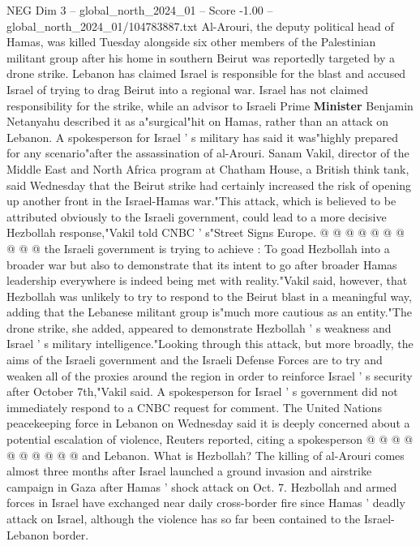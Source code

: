 \begin{textsample}{NEG Dim 3 – global\_north\_2024\_01 – Score -1.00 – global\_north\_2024\_01/104783887.txt}  \label{ex:f3_neg_219}
Al-Arouri, the deputy political head of Hamas, was killed Tuesday alongside six other members of the Palestinian militant group after his home in southern Beirut was reportedly targeted by a drone strike.
Lebanon has claimed Israel is responsible for the blast and accused Israel of trying to drag Beirut into a regional war.
Israel has not claimed responsibility for the strike, while an advisor to Israeli Prime \textbf{Minister} Benjamin Netanyahu described it as a"surgical"hit on Hamas, rather than an attack on Lebanon.
A spokesperson for Israel ' s military has said it was"highly prepared for any scenario"after the assassination of al-Arouri.
Sanam Vakil, director of the Middle East and North Africa program at Chatham House, a British think tank, said Wednesday that the Beirut strike had certainly increased the risk of opening up another front in the Israel-Hamas war."This attack, which is believed to be attributed obviously to the Israeli government, could lead to a more decisive Hezbollah response,"Vakil told CNBC ' s"Street Signs Europe. @ @ @ @ @ @ @ @ @ @ the Israeli government is trying to achieve : To goad Hezbollah into a broader war but also to demonstrate that its intent to go after broader Hamas leadership everywhere is indeed being met with reality."Vakil said, however, that Hezbollah was unlikely to try to respond to the Beirut blast in a meaningful way, adding that the Lebanese militant group is"much more cautious as an entity."The drone strike, she added, appeared to demonstrate Hezbollah ' s weakness and Israel ' s military intelligence."Looking through this attack, but more broadly, the aims of the Israeli government and the Israeli Defense Forces are to try and weaken all of the proxies around the region in order to reinforce Israel ' s security after October 7th,"Vakil said.
A spokesperson for Israel ' s government did not immediately respond to a CNBC request for comment.
The United Nations peacekeeping force in Lebanon on Wednesday said it is deeply concerned about a potential escalation of violence, Reuters reported, citing a spokesperson @ @ @ @ @ @ @ @ @ @ and Lebanon.
What is Hezbollah?
The killing of al-Arouri comes almost three months after Israel launched a ground invasion and airstrike campaign in Gaza after Hamas ' shock attack on Oct. 7.
Hezbollah and armed forces in Israel have exchanged near daily cross-border fire since Hamas ' deadly attack on Israel, although the violence has so far been contained to the Israel-Lebanon border.

\end{textsample}
